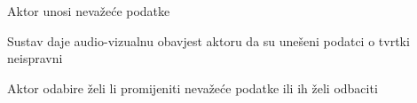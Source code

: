 \begin{packed_item}
\begin{packed_item}
							\item[4.a] Aktor unosi nevažeće podatke
							\item[] \begin{packed_enum}
								
								\item Sustav daje audio-vizualnu obavjest aktoru da su unešeni podatci o tvrtki neispravni
								\item Aktor odabire želi li promijeniti nevažeće podatke ili ih želi odbaciti
								
							\end{packed_enum}
							
						\end{packed_item}
					\end{packed_item}
					
					
					\noindent {}
